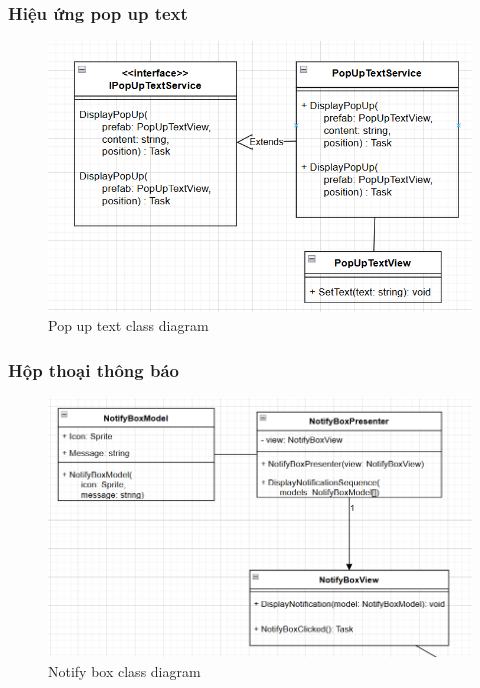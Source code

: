 \subsubsection{Hiệu ứng pop up text}
\begin{figure}[H]
	\centering
	\includegraphics[width=13cm]{Images/PopUpText.png}
	\vspace{0.5cm}
	\caption{Pop up text class diagram}
\end{figure}

\subsubsection{Hộp thoại thông báo}
\begin{figure}[H]
	\centering
	\includegraphics[width=13cm]{Images/NotifyBoxView.png}
	\vspace{0.5cm}
	\caption{Notify box class diagram}
\end{figure}